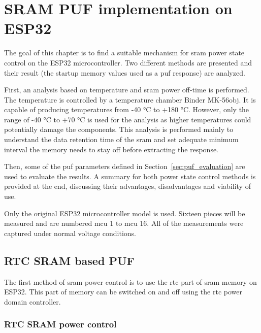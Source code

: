 \chapter{SRAM PUF implementation on ESP32}\label{sec:implementation}


The goal of this chapter is to find a suitable mechanism for \gls{sram} power state control on the ESP32 microcontroller. Two different methods are presented and their result (the startup memory values used as a \gls{puf} response) are analyzed. 

First, an analysis based on temperature and \gls{sram} power off-time is performed. The temperature is controlled by a temperature chamber Binder MK-56obj. It is capable of producing temperatures from -40 °C to +180 °C\cite{Binder2021}. However, only the range of -40 °C to +70 °C is used for the analysis as higher temperatures could potentially damage the components. This analysis is performed mainly to understand the data retention time of the \gls{sram} and set adequate minimum interval the memory needs to stay off before extracting the response.

Then, some of the \gls{puf} parameters defined in Section~\ref{sec:puf_evaluation} are used to evaluate the results. A summary for both power state control methods is provided at the end, discussing their advantages, disadvantages and viability of use.

Only the original ESP32 microcontroller model is used. Sixteen pieces will be measured and are numbered \gls{mcu} 1 to \gls{mcu} 16. All of the measurements were captured under normal voltage conditions. 

\section{RTC SRAM based PUF}

The first method of \gls{sram} power control is to use the \gls{rtc} part of \gls{sram} memory on ESP32. This part of memory can be switched on and off using the \gls{rtc} power domain controller.
 
\subsection{RTC SRAM power control}

